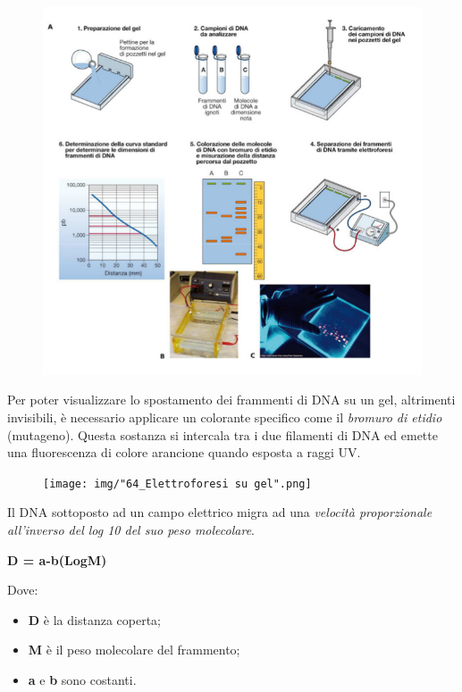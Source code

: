 \documentclass[11pt]{book}
\begin{document}
\begin{figure}[htp]
\centering
\includegraphics[scale=1.00]{img/66_Elettroforesi.png}
\caption{}
\label{elettroforesi}
\end{figure}

Per poter visualizzare lo spostamento dei frammenti di DNA su un gel,
altrimenti invisibili, è necessario applicare un colorante specifico
come il \emph{bromuro di etidio} (mutageno). Questa sostanza si
intercala tra i due filamenti di DNA ed emette una fluorescenza di
colore arancione quando esposta a raggi UV.

\begin{figure}[htp]
\centering
\texttt{[image: img/"64\_Elettroforesi su gel".png]}
\caption{}
\label{elettroforesi-su-gel}
\end{figure}

Il DNA sottoposto ad un campo elettrico migra ad una \emph{velocità
proporzionale all'inverso del log 10 del suo peso molecolare}.

\textbf{D = a-b(LogM)}

Dove:

\begin{itemize}
\itemsep1pt\parskip0pt
\item
  \textbf{D} è la distanza coperta;
\item
  \textbf{M} è il peso molecolare del frammento;
\item
  \textbf{a} e \textbf{b} sono costanti.
\end{itemize}
\end{document}
